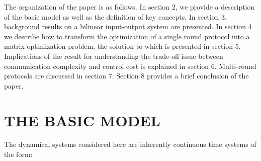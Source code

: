 \documentclass[12pt,onecolumn,draftcls]{IEEEtran}
\begin{document}
The organization of the paper is as follows.  In section 2, we provide a description of the basic
model  as well as the definition of key concepts. 
In section 3, background results on a bilinear input-output system are presented.
In section 4 we describe how to transform the optimization of a single round protocol into a matrix optimization
problem, the solution to which is presented in section 5.  Implications of the result
for understanding  the trade-off issue between communication complexity and control cost is explained in
section 6.   Multi-round protocols are discussed in section 7. 
Section 8 provides a brief conclusion of the paper. 


\section{THE BASIC MODEL}\setcounter{equation}{0}

The dynamical systems considered here are inherently continuous time systems of the form:
\end{document}
